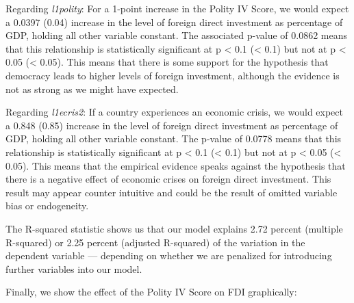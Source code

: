 \documentclass[12pt,letter]{article}\usepackage[]{graphicx}\usepackage[]{color}
\begin{document}
Regarding \textit{l1polity}: For a 1-point increase in the Polity IV Score, we would expect a 0.0397 (0.04) increase in the level of foreign direct investment as percentage of GDP, holding all other variable constant. The associated p-value of 0.0862 means that this relationship is statistically significant at p < 0.1 (\alpha < 0.1) but not at p < 0.05 (\alpha < 0.05). This means that there is some support for the hypothesis that democracy leads to higher levels of foreign investment, although the evidence is not as strong as we might have expected.

Regarding \textit{l1ecris2}: If a country experiences an economic crisis, we would expect a 0.848 (0.85) increase in the level of foreign direct investment as percentage of GDP, holding all other variable constant. The p-value of 0.0778 means that this relationship is statistically significant at p < 0.1 (\alpha < 0.1) but not at p < 0.05 (\alpha < 0.05). This means that the empirical evidence speaks against the hypothesis that there is a negative effect of economic crises on foreign direct investment. This result may appear counter intuitive and could be the result of omitted variable bias or endogeneity.

The R-squared statistic shows us that our model explains 2.72 percent (multiple R-squared) or 2.25 percent (adjusted R-squared) of the variation in the dependent variable --- depending on whether we are penalized for introducing further variables into our model.

Finally, we show the effect of the Polity IV Score on FDI graphically:
\end{document}
